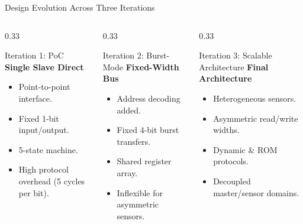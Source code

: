 \documentclass{beamer}
\begin{document}
\begin{frame}{Design Evolution Across Three Iterations}
  \begin{columns}
    \begin{column}{0.33\textwidth}
      \begin{block}{\small Iteration 1: PoC}
        \scriptsize
        \textbf{Single Slave Direct}
        \begin{itemize}
          \item Point-to-point interface.
          \item Fixed 1-bit input/output.
          \item 5-state machine.
          \item High protocol overhead (5 cycles per bit).
        \end{itemize}
      \end{block}
    \end{column}
    \begin{column}{0.33\textwidth}
      \begin{block}{\small Iteration 2: Burst-Mode}
        \scriptsize
        \textbf{Fixed-Width Bus}
        \begin{itemize}
          \item Address decoding added.
          \item Fixed 4-bit burst transfers.
          \item Shared register array.
          \item Inflexible for asymmetric sensors.
        \end{itemize}
      \end{block}
    \end{column}
    \begin{column}{0.33\textwidth}
      \begin{block}{\small Iteration 3: Scalable Architecture}
        \scriptsize
        \textbf{Final Architecture}
        \begin{itemize}
          \item Heterogeneous sensors.
          \item Asymmetric read/write widths.
          \item Dynamic \& ROM protocols.
          \item Decoupled master/sensor domains.
        \end{itemize}
      \end{block}
    \end{column}
  \end{columns}
\end{frame}
\end{document}
